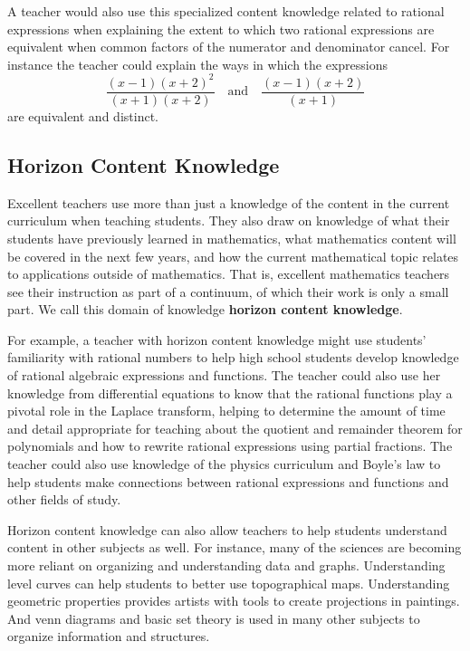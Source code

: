 \documentclass[
]{book}
\theoremstyle{definition}
\theoremstyle{definition}
\theoremstyle{definition}
\theoremstyle{definition}
\theoremstyle{remark}
\begin{document}
A teacher would also use this specialized content knowledge related to rational expressions when explaining the extent to which two rational expressions are equivalent when common factors of the numerator and denominator cancel. For instance the teacher could explain the ways in which the expressions
\[\frac{(x-1)(x+2)^2}{(x+1)(x+2)} \quad \mbox{and} \quad \frac{(x-1)(x+2)}{(x+1)}\] are equivalent and distinct.

\hypertarget{horizon-content-knowledge}{%
\subsection{Horizon Content Knowledge}\label{horizon-content-knowledge}}

Excellent teachers use more than just a knowledge of the content in the current curriculum when teaching students. They also draw on knowledge of what their students have previously learned in mathematics, what mathematics content will be covered in the next few years, and how the current mathematical topic relates to applications outside of mathematics. That is, excellent mathematics teachers see their instruction as part of a continuum, of which their work is only a small part. We call this domain of knowledge \textbf{horizon content knowledge}.

For example, a teacher with horizon content knowledge might use students' familiarity with rational numbers to help high school students develop knowledge of rational algebraic expressions and functions. The teacher could also use her knowledge from differential equations to know that the rational functions play a pivotal role in the Laplace transform, helping to determine the amount of time and detail appropriate for teaching about the quotient and remainder theorem for polynomials and how to rewrite rational expressions using partial fractions. The teacher could also use knowledge of the physics curriculum and Boyle's law to help students make connections between rational expressions and functions and other fields of study.

Horizon content knowledge can also allow teachers to help students understand content in other subjects as well. For instance, many of the sciences are becoming more reliant on organizing and understanding data and graphs. Understanding level curves can help students to better use topographical maps. Understanding geometric properties provides artists with tools to create projections in paintings. And venn diagrams and basic set theory is used in many other subjects to organize information and structures.
\end{document}
